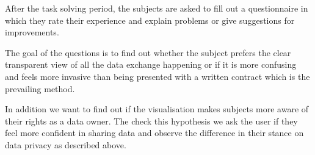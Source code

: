 \documentclass[../paper.tex]{subfiles}
\begin{document}
  After the task solving period, the subjects are asked to fill out a
  questionnaire in which they rate their experience and explain problems or
  give suggestions for improvements.

  The goal of the questions is to find out whether the subject prefers the clear
  transparent view of all the data exchange happening or if it is more confusing
  and feels more invasive than being presented with a written contract which 
  is the prevailing method.

  In addition we want to find out if the visualisation makes subjects more
  aware of their rights as a data owner. The check this hypothesis we ask the user if they feel more confident in sharing data and observe the difference in their stance on data privacy as described above.
\end{document}
